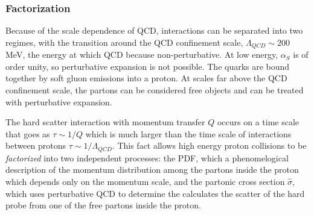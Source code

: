 \subsubsection{Factorization}


Because of the scale dependence of QCD, interactions can be separated into two regimes, with the transition around the QCD confinement scale, $\Lambda_{QCD} \sim 200$ MeV, the energy at which QCD because non-perturbative. At low energy, $\alpha_S$ is of order unity, so perturbative expansion is not possible. The quarks are bound together by soft gluon emissions into a proton. At scales far above the QCD confinement scale, the partons can be considered free objects and can be treated with perturbative expansion.

The hard scatter interaction with momentum transfer $Q$ occurs on a time scale that goes as $\tau \sim 1/Q$ which is much larger than the time scale of interactions between protons $\tau \sim 1/\Lambda_{QCD}$. This fact allows high energy proton collisions to be \textit{factorized} into two independent processes: the PDF, which a phenomelogical description of the momentum distribution among the partons inside the proton which depends only on the momentum scale, and the partonic cross section $\hat{\sigma}$, which uses perturbative QCD to determine the calculates the scatter of the hard probe from one of the free partons inside the proton.


